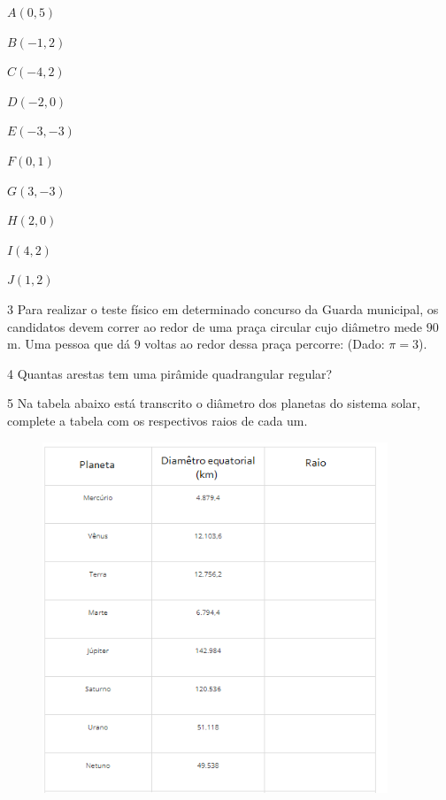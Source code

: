 \begin{escolha}
\item $A (0,5)$
\item $B (-1,2)$
\item $C (-4,2)$
\item $D (-2,0)$
\item $E (-3,-3)$
\item $F (0,1)$
\item $G (3,-3)$
\item $H (2,0)$
\item $I (4,2)$
\item $J (1,2)$
\end{escolha}



\num{3}  Para realizar o teste físico em determinado concurso da Guarda
municipal, os candidatos devem correr ao redor de uma praça circular
cujo diâmetro mede $90$ m. Uma pessoa que dá $9$ voltas ao redor dessa praça
percorre: (Dado: $π = 3$).


\num{4}  Quantas arestas tem uma pirâmide quadrangular regular?


\num{5}  Na tabela abaixo está transcrito o diâmetro dos planetas do sistema
solar, complete a tabela com os respectivos raios de cada um.

\begin{figure}[h]
\centering\includegraphics[width=4.05833in,height=4.13212in]{./imgSAEB_6_MAT/media/image48.png}
\end{figure}

